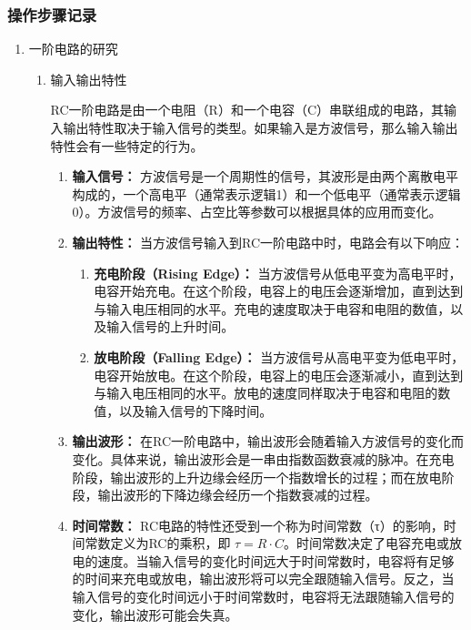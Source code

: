 \documentclass[dvipsnames, svgnames,a4paper,11pt]{article}
\begin{document}
	\subsubsection{操作步骤记录}
	\begin{enumerate}
		\item 一阶电路的研究
		\begin{enumerate}
			\item 输入输出特性
			
			RC一阶电路是由一个电阻（R）和一个电容（C）串联组成的电路，其输入输出特性取决于输入信号的类型。如果输入是方波信号，那么输入输出特性会有一些特定的行为。
			
			\begin{enumerate}
				\item \textbf{输入信号：} 方波信号是一个周期性的信号，其波形是由两个离散电平构成的，一个高电平（通常表示逻辑1）和一个低电平（通常表示逻辑0）。方波信号的频率、占空比等参数可以根据具体的应用而变化。
				
				\item \textbf{输出特性：} 当方波信号输入到RC一阶电路中时，电路会有以下响应：
				\begin{enumerate}
					\item \textbf{充电阶段（Rising Edge）：} 当方波信号从低电平变为高电平时，电容开始充电。在这个阶段，电容上的电压会逐渐增加，直到达到与输入电压相同的水平。充电的速度取决于电容和电阻的数值，以及输入信号的上升时间。
					
					\item \textbf{放电阶段（Falling Edge）：} 当方波信号从高电平变为低电平时，电容开始放电。在这个阶段，电容上的电压会逐渐减小，直到达到与输入电压相同的水平。放电的速度同样取决于电容和电阻的数值，以及输入信号的下降时间。
				\end{enumerate}
				
				\item \textbf{输出波形：} 在RC一阶电路中，输出波形会随着输入方波信号的变化而变化。具体来说，输出波形会是一串由指数函数衰减的脉冲。在充电阶段，输出波形的上升边缘会经历一个指数增长的过程；而在放电阶段，输出波形的下降边缘会经历一个指数衰减的过程。
				
				\item \textbf{时间常数：} RC电路的特性还受到一个称为时间常数（τ）的影响，时间常数定义为RC的乘积，即 \( \tau = R \cdot C \)。时间常数决定了电容充电或放电的速度。当输入信号的变化时间远大于时间常数时，电容将有足够的时间来充电或放电，输出波形将可以完全跟随输入信号。反之，当输入信号的变化时间远小于时间常数时，电容将无法跟随输入信号的变化，输出波形可能会失真。
			\end{enumerate}
			

\end{enumerate}
\end{enumerate}
\end{document}

